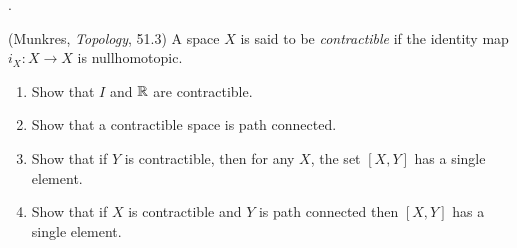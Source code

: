 \documentclass[12pt]{article}
\begin{document}
\begin{solu} .

\end{solu}
\newpage

\begin{problab}{7}
(Munkres, \emph{Topology}, 51.3) A space $X$ is said to be \emph{contractible} if the identity map $i_X: X \to X$ is nullhomotopic. 
\begin{enumerate}
\item Show that $I$ and $\mathbb R$ are contractible.
\item Show that a contractible space is path connected.
\item Show that if $Y$ is contractible, then for any $X$, the set $[X,Y]$ has a single element.
\item Show that if $X$ is contractible and $Y$ is path connected then $[X,Y]$ has a single element. 
\end{enumerate}
\end{problab}
\end{document}
